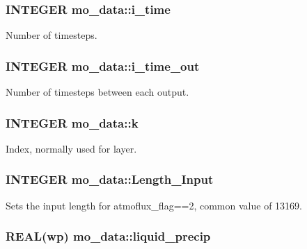 \hypertarget{namespacemo__data_abca60ca0614b7061c6ef58e6e6daa60f}{
\subsubsection[{i\_\-time}]{\setlength{\rightskip}{0pt plus 5cm}INTEGER {\bf mo\_\-data::i\_\-time}}}
\label{namespacemo__data_abca60ca0614b7061c6ef58e6e6daa60f}


Number of timesteps. 

\hypertarget{namespacemo__data_aa28d05f6fec3b61de0fbd7b4aa67f6ae}{
\subsubsection[{i\_\-time\_\-out}]{\setlength{\rightskip}{0pt plus 5cm}INTEGER {\bf mo\_\-data::i\_\-time\_\-out}}}
\label{namespacemo__data_aa28d05f6fec3b61de0fbd7b4aa67f6ae}


Number of timesteps between each output. 

\hypertarget{namespacemo__data_afe6f17e4b469a746c68d9233d35ad11f}{
\subsubsection[{k}]{\setlength{\rightskip}{0pt plus 5cm}INTEGER {\bf mo\_\-data::k}}}
\label{namespacemo__data_afe6f17e4b469a746c68d9233d35ad11f}


Index, normally used for layer. 

\hypertarget{namespacemo__data_a9a0ff39379f1d347bcb323cd49cb222e}{
\subsubsection[{Length\_\-Input}]{\setlength{\rightskip}{0pt plus 5cm}INTEGER {\bf mo\_\-data::Length\_\-Input}}}
\label{namespacemo__data_a9a0ff39379f1d347bcb323cd49cb222e}


Sets the input length for atmoflux\_\-flag==2, common value of 13169. 

\hypertarget{namespacemo__data_ace52326d57ce881a5017a47fed1c5a17}{
\subsubsection[{liquid\_\-precip}]{\setlength{\rightskip}{0pt plus 5cm}REAL(wp) {\bf mo\_\-data::liquid\_\-precip}}}
\label{namespacemo__data_ace52326d57ce881a5017a47fed1c5a17}


